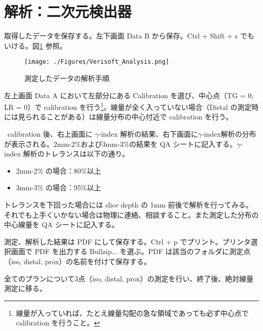 \documentclass[11pt,a4paper]{jsarticle}
\newcommand{\noindot}{\noindent{$\cdot$}} %
\begin{document}
\section{解析：二次元検出器}
\noindot 取得したデータを保存する。左下画面 Data B から保存。Ctrl + Shift + s でもいける。図\ref{fig:Verisoft_Analysis} 参照。\par
	\begin{figure}[htbp]
		\centering
		\texttt{[image: ./Figures/Verisoft\_Analysis.png]}
		\caption{測定したデータの解析手順}
		\label{fig:Verisoft_Analysis}
	\end{figure}%
\noindot 左上画面 Data A において左部分にある Calibration を選び、中心点（TG = 0, LR = 0）で calibration を行う\footnote{線量が入っていれば、たとえ線量勾配の急な領域であっても必ず中心点で calibration を行うこと。}。線量が全く入っていない場合（Distal の測定時には見られることがある）は線量分布の中心付近で calibration を行う。\par
\noindot ~calibration 後、右上画面に $\gamma$-index 解析の結果、右下画面に$\gamma$-index解析の分布が表示される。2mm-2\%および3mm-3\%の結果を QA シートに記入する。$\gamma$-index 解析のトレランスは以下の通り。
	\begin{itemize}
		\item 2mm-2\% の場合：80\%以上
		\item 3mm-3\% の場合：95\%以上
	\end{itemize}%
トレランスを下回った場合には slice depth の 1mm 前後で解析を行ってみる。それでも上手くいかない場合は物理に連絡、相談すること。また測定した分布の中心線量を QA シートに記入する。\par
\noindot 測定、解析した結果は PDF にして保存する。Ctrl + p でプリント。プリンタ選択画面で PDF を出力する Bullzip... を選ぶ。PDF は該当のフォルダに測定点（iso, distal, prox）の名前を付けて保存する。\par
\noindot 全てのプランについて3点（iso, distal, prox）の測定を行い、終了後、絶対線量測定に移る。
%
\end{document}
